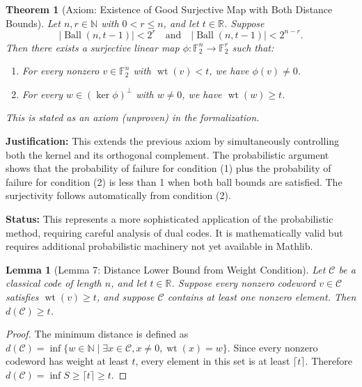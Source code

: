 \documentclass[11pt]{article}
\theoremstyle{plain}
\newtheorem*{theorem}{Theorem}
\newtheorem*{lemma}{Lemma}
\theoremstyle{definition}
\theoremstyle{remark}
\renewcommand{\ker}{\operatorname{ker}}
\begin{document}
\begin{theorem}[Axiom: Existence of Good Surjective Map with Both Distance Bounds]
Let $n, r \in \mathbb{N}$ with $0 < r \leq n$, and let $t \in \mathbb{R}$. Suppose
\[
\bigl|\operatorname{Ball}(n, t-1)\bigr| < 2^r \quad \text{and} \quad \bigl|\operatorname{Ball}(n, t-1)\bigr| < 2^{n-r}.
\]
Then there exists a surjective linear map $\phi : \mathbb{F}_2^n \to \mathbb{F}_2^r$ such that:
\begin{enumerate}
\item For every nonzero $v \in \mathbb{F}_2^n$ with $\operatorname{wt}(v) < t$, we have $\phi(v) \neq 0$.
\item For every $w \in (\ker \phi)^\perp$ with $w \neq 0$, we have $\operatorname{wt}(w) \geq t$.
\end{enumerate}

\textit{This is stated as an axiom (unproven) in the formalization.}
\end{theorem}

\textbf{Justification:} This extends the previous axiom by simultaneously controlling both the kernel and its orthogonal complement. The probabilistic argument shows that the probability of failure for condition (1) plus the probability of failure for condition (2) is less than 1 when both ball bounds are satisfied. The surjectivity follows automatically from condition (2).

\textbf{Status:} This represents a more sophisticated application of the probabilistic method, requiring careful analysis of dual codes. It is mathematically valid but requires additional probabilistic machinery not yet available in Mathlib.

\begin{lemma}[Lemma 7: Distance Lower Bound from Weight Condition]
Let $\mathcal{C}$ be a classical code of length $n$, and let $t \in \mathbb{R}$. Suppose every nonzero codeword $v \in \mathcal{C}$ satisfies $\operatorname{wt}(v) \geq t$, and suppose $\mathcal{C}$ contains at least one nonzero element. Then $d(\mathcal{C}) \geq t$.
\end{lemma}

\begin{proof}
The minimum distance is defined as $d(\mathcal{C}) = \inf\{w \in \mathbb{N} \mid \exists x \in \mathcal{C}, x \neq 0, \operatorname{wt}(x) = w\}$. Since every nonzero codeword has weight at least $t$, every element in this set is at least $\lceil t \rceil$. Therefore $d(\mathcal{C}) = \inf S \geq \lceil t \rceil \geq t$.
\end{proof}
\end{document}
